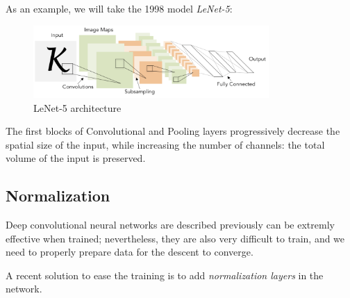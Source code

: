 As an example, we will take the 1998 model \emph{LeNet-5}:
\begin{figure}[H]
    \centering
    \includegraphics[width=0.8\textwidth]{images/lenet-5.png}
    \caption{LeNet-5 architecture}
\end{figure}
The first blocks of Convolutional and Pooling layers progressively decrease the spatial size of the input, while increasing the number of channels: the total volume of the input is preserved.

\subsection{Normalization}
Deep convolutional neural networks are described previously can be extremly effective when trained; nevertheless, they are also very difficult to train, and we need to properly prepare data for the descent to converge.

A recent solution to ease the training is to add \emph{normalization layers} in the network.